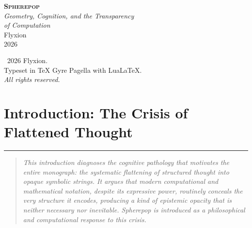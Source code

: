 \documentclass[12pt,openany]{book}
\theoremstyle{plain}
\theoremstyle{definition}
\theoremstyle{remark}
\newcommand{\chapterrule}{%
  \vspace{4pt}%
  {\color{SpherepopBlue}\rule{\textwidth}{0.8pt}}%
  \vspace{10pt}%
}
\newenvironment{chapterprecis}{%
  \begin{quote}\small\itshape}{%
  \end{quote}\medskip}
\begin{document}
\begin{titlepage}
\thispagestyle{empty}
\vspace*{2.5in}
\begin{center}
  {\LARGE\bfseries\scshape Spherepop}\\[0.5em]
  {\large\itshape Geometry, Cognition, and the Transparency\\[0.2em]
  of Computation}\\[2em]
  {\large Flyxion}\\[1em]
  {\normalsize 2026}
\end{center}
\vfill
\end{titlepage}
 \clearpage

\thispagestyle{empty}
\vspace*{\fill}
\begin{center}
\small
\textcopyright\ 2026 Flyxion.\\[0.5em]
Typeset in TeX Gyre Pagella with Lua\LaTeX.\\[0.5em]
\textit{All rights reserved.}
\end{center}
\vspace*{\fill}
 \clearpage

\setcounter{tocdepth}{2}
\tableofcontents
 \clearpage

\chapter*{Introduction: The Crisis of Flattened Thought}
\chapterrule

\begin{chapterprecis}
This introduction diagnoses the cognitive pathology that motivates
the entire monograph: the systematic flattening of structured
thought into opaque symbolic strings. It argues that modern
computational and mathematical notation, despite its expressive
power, routinely conceals the very structure it encodes, producing
a kind of epistemic opacity that is neither necessary nor
inevitable. Spherepop is introduced as a philosophical and
computational response to this crisis.
\end{chapterprecis}
\end{document}

